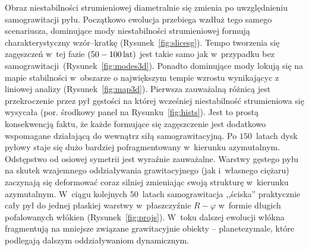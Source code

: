 %
\par Obraz niestabilności strumieniowej diametralnie się zmienia po
uwzględnieniu samograwitacji pyłu. Początkowo ewolucja przebiega wzdłuż tego
samego scenariusza, dominujące mody niestabilności strumieniowej formują
charakterystyczny wzór--kratkę (Rysunek~\ref{fig:slicesg}). Tempo tworzenia się
zagęszczeń w~tej fazie $(50 - 100\hbox{$\thinspace\textrm{lat}$})$ jest takie samo jak w~przypadku bez
samograwitacji~(Rysunek~\ref{fig:modes3d}). Ponadto dominujące mody lokują się
na mapie stabilności w~obszarze o największym tempie wzrostu wynikającyc z
liniowej analizy (Rysunek~\ref{fig:map3d}).  Pierwsza zauważalną różnicą jest
przekroczenie przez pył gęstości na której wcześniej niestabilność strumieniowa
się wysycała (por. środkowy panel na Rysunku~\ref{fig:hists}). Jest to prostą
konsekwencją faktu, że każde formujące się zagęszczenie jest dodatkowo
wspomagane działającą do wewnątrz siłą samograwitacyjną. Po $150$~latach dysk
pyłowy staje się dużo bardziej pofragmentowany w~kierunku azymutalnym.
Odstępstwo od osiowej symetrii jest wyraźnie zauważalne. Warstwy gęstego pyłu na
skutek wzajemnego oddziaływania grawitacyjnego (jak i~własnego ciężaru)
zaczynają się deformować coraz silniej zmieniając swoją strukturę w~kierunku
azymutalnym. W~ciągu kolejnych $50$~latach samograwitacja ,,ściska'' praktycznie
cały pył do jednej płaskiej warstwy w~płaszczyźnie $R - \varphi$ w~formie
długich pofalowanych włókien (Rysunek~\ref{fig:projs}). W~toku dalszej ewolucji
włókna fragmentują na mniejsze związane grawitacyjnie obiekty -- planetezymale,
które podlegają dalszym oddziaływaniom dynamicznym. 

